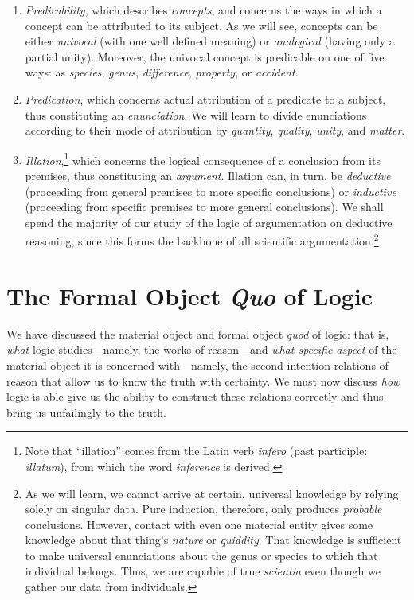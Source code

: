 \documentclass[
  12pt,
]{memoir}
\begin{document}
\begin{enumerate}
\def\labelenumi{\arabic{enumi}.}
\item
  \emph{Predicability}, which describes \emph{concepts}, and concerns
  the ways in which a concept can be attributed to its subject. As we
  will see, concepts can be either \emph{univocal} (with one well
  defined meaning) or \emph{analogical} (having only a partial unity).
  Moreover, the univocal concept is predicable on one of five ways: as
  \emph{species}, \emph{genus}, \emph{difference}, \emph{property}, or
  \emph{accident}.
\item
  \emph{Predication}, which concerns actual attribution of a predicate
  to a subject, thus constituting an \emph{enunciation}. We will learn
  to divide enunciations according to their mode of attribution by
  \emph{quantity}, \emph{quality}, \emph{unity}, and \emph{matter}.
\item
  \emph{Illation},\footnote{Note that ``illation'' comes from the Latin
    verb \emph{infero} (past participle: \emph{illatum}), from which the
    word \emph{inference} is derived.} which concerns the logical
  consequence of a conclusion from its premises, thus constituting an
  \emph{argument}. Illation can, in turn, be \emph{deductive}
  (proceeding from general premises to more specific conclusions) or
  \emph{inductive} (proceeding from specific premises to more general
  conclusions). We shall spend the majority of our study of the logic of
  argumentation on deductive reasoning, since this forms the backbone of
  all scientific argumentation.\footnote{As we will learn, we cannot
    arrive at certain, universal knowledge by relying solely on singular
    data. Pure induction, therefore, only produces \emph{probable}
    conclusions. However, contact with even one material entity gives
    some knowledge about that thing's \emph{nature} or \emph{quiddity}.
    That knowledge is sufficient to make universal enunciations about
    the genus or species to which that individual belongs. Thus, we are
    capable of true \emph{scientia} even though we gather our data from
    individuals.}
\end{enumerate}

\section{\texorpdfstring{The Formal Object \emph{Quo} of
Logic}{The Formal Object Quo of Logic}}\label{the-formal-object-quo-of-logic}

We have discussed the material object and formal object \emph{quod} of
logic: that is, \emph{what} logic studies---namely, the works of
reason---and \emph{what specific aspect} of the material object it is
concerned with---namely, the second-intention relations of reason that
allow us to know the truth with certainty. We must now discuss
\emph{how} logic is able give us the ability to construct these
relations correctly and thus bring us unfailingly to the truth.
\end{document}
